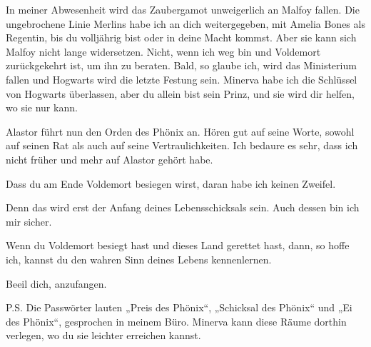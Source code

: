 \begin{writtenNote}
In meiner Abwesenheit wird das Zaubergamot unweigerlich an Malfoy fallen. Die ungebrochene Linie Merlins habe ich an dich weitergegeben, mit Amelia Bones als Regentin, bis du volljährig bist oder in deine Macht kommst. Aber sie kann sich Malfoy nicht lange widersetzen. Nicht, wenn ich weg bin und Voldemort zurückgekehrt ist, um ihn zu beraten. Bald, so glaube ich, wird das Ministerium fallen und Hogwarts wird die letzte Festung sein. Minerva habe ich die Schlüssel von Hogwarts überlassen, aber du allein bist sein Prinz, und sie wird dir helfen, wo sie nur kann.

Alastor führt nun den Orden des Phönix an. Hören gut auf seine Worte, sowohl auf seinen Rat als auch auf seine Vertraulichkeiten. Ich bedaure es sehr, dass ich nicht früher und mehr auf Alastor gehört habe.

Dass du am Ende Voldemort besiegen wirst, daran habe ich keinen Zweifel.

Denn das wird erst der Anfang deines Lebensschicksals sein. Auch dessen bin ich mir sicher.

Wenn du Voldemort besiegt hast und dieses Land gerettet hast, dann, so hoffe ich, kannst du den wahren Sinn deines Lebens kennenlernen.

Beeil dich, anzufangen.


P.S. Die Passwörter lauten „Preis des Phönix“, „Schicksal des Phönix“ und „Ei des Phönix“, gesprochen in meinem Büro. Minerva kann diese Räume dorthin verlegen, wo du sie leichter erreichen kannst.
\end{writtenNote}

